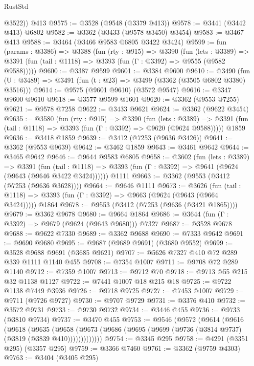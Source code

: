 \begin{lexlean}{RustStd}
\begin{coremodule}
        @3522))
    @413
@9575 := @3528 (@9548 (@3379 @413))
@9578 := @3441 (@3442 @413) @6802
@9582 := @3362 (@3433 (@9578 @3450) @3454)
@9583 := @3467 @413
@9588 := @3464 (@3466 @9583 @6805 @3422 @3424)
@9599 := fun (params : @3386) =>
  @3388
    (fun (rty : @915) =>
    @3390
      (fun (lets : @3389) =>
      @3391 (fun (tail : @1118) => @3393 (fun (Γ : @3392) => @9555 (@9582 @9588)))))
@9600 := @3387 @9599
@9601 := @3384 @9600
@9610 := @3490 (fun (U : @3489) => @3491 (fun (t : @23) => @3499 (@3362 (@3505 @6802 @3380) @3516)))
@9614 := @9575 (@9601 @9610) (@3572 @9547)
@9616 := @3347 @9600 @9610
@9618 := @3577 @9599 @1601
@9620 := @3362 (@9553 @7255)
@9621 := @9578 @7258
@9622 := @3433 @9621
@9624 := @3362 (@9622 @3454)
@9635 := @3580
    (fun (rty : @915) =>
    @3390
      (fun (lets : @3389) =>
      @3391 (fun (tail : @1118) => @3393 (fun (Γ : @3392) => @9620 (@9624 @9588)))))
    @1859
@9636 := @3418 @1859
@9639 := @3412 (@7253 (@9636 @3426))
@9641 := @3362 (@9553 @9639)
@9642 := @3462 @1859
@9643 := @3461 @9642
@9644 := @3465 @9642
@9646 := @9644 @9583 @6805
@9658 := @3602
    (fun (lets : @3389) =>
    @3391
      (fun (tail : @1118) => @3393 (fun (Γ : @3392) => @9641 (@9624 (@9643 (@9646 @3422 @3424))))))
    @1111
@9663 := @3362 (@9553 (@3412 (@7253 (@9636 @3628))))
@9664 := @9646 @1111
@9673 := @3626
    (fun (tail : @1118) => @3393 (fun (Γ : @3392) => @9663 (@9624 (@9643 (@9664 @3424)))))
    @1864
@9678 := @9553 (@3412 (@7253 (@9636 (@3421 @1865))))
@9679 := @3362 @9678
@9680 := @9664 @1864
@9686 := @3644 (fun (Γ : @3392) => @9679 (@9624 (@9643 @9680))) @7327
@9687 := @3528 @9678
@9688 := @9622 @7330
@9689 := @3362 @9688
@9690 := @7333 @9642
@9691 := @9690 @9680
@9695 := @9687 (@9689 @9691) (@3680 @9552)
@9699 := @3528 @9688 @9691 (@3685 @9621)
@9707 := @5626 @7327 @410 @72 @289 @339 @1111 @1140 @455
@9708 := @7354 @1007
@9711 := @9708 @72 @289 @1140
@9712 := @7359 @1007
@9713 := @9712 @70
@9718 := @9713 @55 @215 @32 @1138 @1127
@9722 := @7441 @1007 @18 @215 @18
@9725 := @9722 @1138 @7449 @3936
@9726 := @9718 @9725
@9727 := @7453 @1007
@9729 := @9711 (@9726 @9727)
@9730 := @9707 @9729
@9731 := @3376 @410
@9732 := @3572 @9731
@9733 := @9730 @9732
@9734 := @3446 @455
@9736 := @9733 (@3810 @9734)
@9737 := @3470 @455
@9753 := @9546
    (@9572
      (@9614
        (@9616
          (@9618
            (@9635
              (@9658
                (@9673 (@9686 (@9695 (@9699 (@9736 (@3814 @9737) (@3819 (@3839 @410)))))))))))))
@9754 := @3345 @295
@9758 := @4291 (@3351 @295) (@3357 @295)
@9759 := @3366 @7460
@9761 := @3362 (@9759 @4303)
@9763 := @3404 (@3405 @295)

\end{coremodule}
\end{lexlean}
